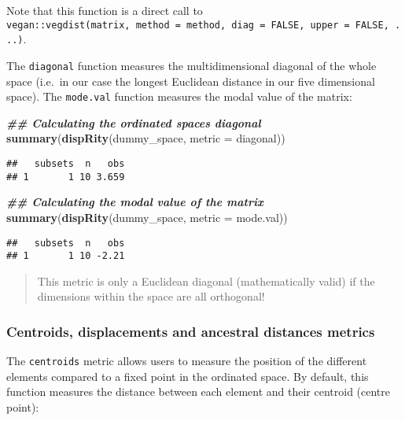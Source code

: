 \documentclass[
]{book}
\newenvironment{Shaded}{\begin{snugshade}}{\end{snugshade}}
\newcommand{\AttributeTok}[1]{\textcolor[rgb]{0.13,0.29,0.53}{#1}}
\newcommand{\DocumentationTok}[1]{\textcolor[rgb]{0.56,0.35,0.01}{\textbf{\textit{#1}}}}
\newcommand{\FunctionTok}[1]{\textcolor[rgb]{0.13,0.29,0.53}{\textbf{#1}}}
\newcommand{\NormalTok}[1]{#1}
\begin{document}
Note that this function is a direct call to \texttt{vegan::vegdist(matrix,\ method\ =\ method,\ diag\ =\ FALSE,\ upper\ =\ FALSE,\ ...)}.

The \texttt{diagonal} function measures the multidimensional diagonal of the whole space (i.e.~in our case the longest Euclidean distance in our five dimensional space).
The \texttt{mode.val} function measures the modal value of the matrix:

\begin{Shaded}
\begin{Highlighting}[]
\DocumentationTok{\#\# Calculating the ordinated space\textquotesingle{}s diagonal}
\FunctionTok{summary}\NormalTok{(}\FunctionTok{dispRity}\NormalTok{(dummy\_space, }\AttributeTok{metric =}\NormalTok{ diagonal))}
\end{Highlighting}
\end{Shaded}

\begin{verbatim}
##   subsets  n   obs
## 1       1 10 3.659
\end{verbatim}

\begin{Shaded}
\begin{Highlighting}[]
\DocumentationTok{\#\# Calculating the modal value of the matrix}
\FunctionTok{summary}\NormalTok{(}\FunctionTok{dispRity}\NormalTok{(dummy\_space, }\AttributeTok{metric =}\NormalTok{ mode.val))}
\end{Highlighting}
\end{Shaded}

\begin{verbatim}
##   subsets  n   obs
## 1       1 10 -2.21
\end{verbatim}

\begin{quote}
This metric is only a Euclidean diagonal (mathematically valid) if the dimensions within the space are all orthogonal!
\end{quote}

\hypertarget{centroids}{%
\subsubsection{Centroids, displacements and ancestral distances metrics}\label{centroids}}

The \texttt{centroids} metric allows users to measure the position of the different elements compared to a fixed point in the ordinated space.
By default, this function measures the distance between each element and their centroid (centre point):
\end{document}
